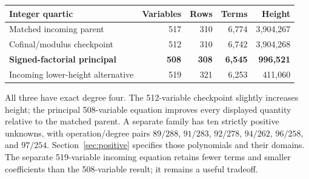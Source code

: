 \begin{center}
\begin{tabular}{lrrrr}
\toprule
Integer quartic & Variables & Rows & Terms & Height\\
\midrule
Matched incoming parent & 517 & 310 & 6,774 & 3,904,267\\
Cofinal/modulus checkpoint & 512 & 310 & 6,742 & 3,904,268\\
\textbf{Signed-factorial principal} & \textbf{508} & \textbf{308}
 & \textbf{6,545} & \textbf{996,521}\\
\addlinespace
Incoming lower-height alternative & 519 & 321 & 6,253 & 411,060\\
\bottomrule
\end{tabular}
\end{center}
All three have exact degree four. The 512-variable checkpoint slightly
increases height; the principal 508-variable equation improves every
displayed quantity relative to the matched parent. A separate family has
ten strictly positive unknowns, with operation/degree pairs
$89/288$, $91/283$, $92/278$, $94/262$, $96/258$, and $97/254$.
Section~\ref{sec:positive} specifies those polynomials and their domains.
The separate 519-variable incoming equation retains fewer terms and smaller
coefficients than the 508-variable result; it remains a useful tradeoff.
